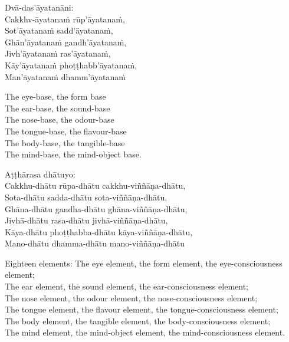 \suttaRef{[MN 109]}

Dvā-das’āyatanāni:\\
Cakkhv-āyatanaṁ rūp’āyatanaṁ,\\
Sot’āyatanaṁ sadd’āyatanaṁ,\\
Ghān’āyatanaṁ gandh’āyatanaṁ,\\
Jivh’āyatanaṁ ras’āyatanaṁ,\\
Kāy’āyatanaṁ phoṭṭhabb’āyatanaṁ,\\
Man’āyatanaṁ dhamm’āyatanaṁ

\begin{english}
  The eye-base, the form base\\
  The ear-base, the sound-base\\
  The nose-base, the odour-base\\
  The tongue-base, the flavour-base\\
  The body-base, the tangible-base\\
  The mind-base, the mind-object base.
\end{english}

\suttaRef{[MN 148]}

Aṭṭhārasa dhātuyo:\\
Cakkhu-dhātu rūpa-dhātu cakkhu-viññāṇa-dhātu,\\
Sota-dhātu sadda-dhātu sota-viññāṇa-dhātu,\\
Ghāna-dhātu gandha-dhātu ghāna-viññāṇa-dhātu,\\
Jivhā-dhātu rasa-dhātu jivhā-viññāṇa-dhātu,\\
Kāya-dhātu phoṭṭhabba-dhātu kāya-viññāṇa-dhātu,\\
Mano-dhātu dhamma-dhātu mano-viññāṇa-dhātu

\begin{english}
  Eighteen elements: The eye element, the form element, the eye-consciousness\\
  element;\\
  The ear element, the sound element, the ear-consciousness element;\\
  The nose element, the odour element, the nose-consciousness element;\\
  The tongue element, the flavour element, the tongue-consciousness element;\\
  The body element, the tangible element, the body-consciousness element;\\
  The mind element, the mind-object element, the mind-consciousness element.
\end{english}

